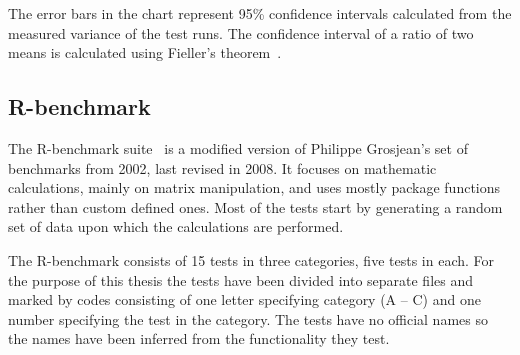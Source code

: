 \documentclass[thesis=M,english,hidelinks]{FITthesis}[2012/10/20]
\begin{document}
		The error bars in the chart represent 95\% confidence intervals calculated from the measured variance of the test runs. The confidence interval of a ratio of two means is calculated using Fieller's theorem~\cite{fieller}.\par
	
		\subsection{R-benchmark}
		The R-benchmark suite~\cite{r_benchmark} is a modified version of Philippe Grosjean's set of benchmarks from 2002, last revised in 2008. It focuses on mathematic calculations, mainly on matrix manipulation, and uses mostly package functions rather than custom defined ones. Most of the tests start by generating a random set of data upon which the calculations are performed.\par
		
		The R-benchmark consists of 15 tests in three categories, five tests in each. For the purpose of this thesis the tests have been divided into separate files and marked by codes consisting of one letter specifying category (A -- C) and one number specifying the test in the category. The tests have no official names so the names have been inferred from the functionality they test.\par
		
\end{document}
